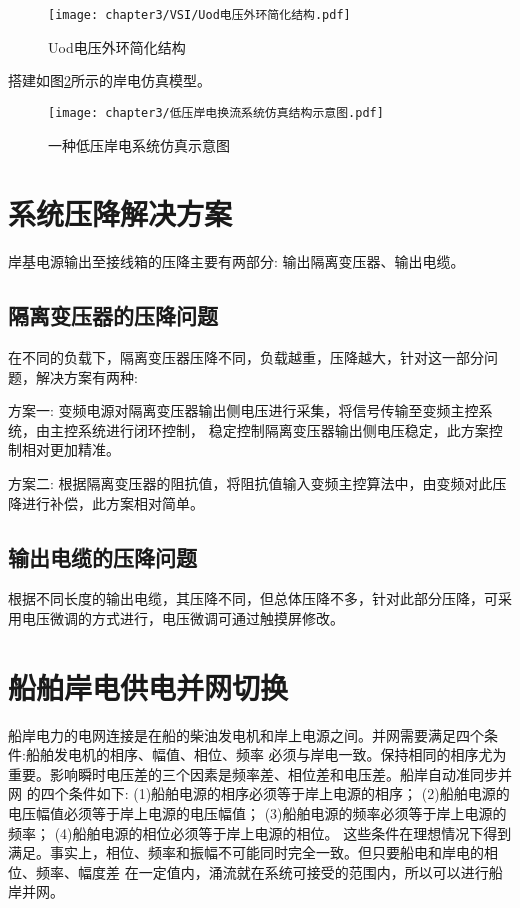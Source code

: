 \begin{figure}[!htp]
	\centering
	\texttt{[image: chapter3/VSI/Uod电压外环简化结构.pdf]}
	\caption{Uod电压外环简化结构}
	\label{fig:Uod电压外环简化结构}
\end{figure}

搭建如图\ref{fig:低压岸电系统仿真示意图}所示的岸电仿真模型。

\begin{figure}[!htp]
	\centering
	\texttt{[image: chapter3/低压岸电换流系统仿真结构示意图.pdf]}
	\caption{一种低压岸电系统仿真示意图}
	\label{fig:低压岸电系统仿真示意图}
\end{figure}

\section{系统压降解决方案}

岸基电源输出至接线箱的压降主要有两部分: 输出隔离变压器、输出电缆。

\subsection{隔离变压器的压降问题}

在不同的负载下，隔离变压器压降不同，负载越重，压降越大，针对这一部分问题，解决方案有两种:

方案一: 变频电源对隔离变压器输出侧电压进行采集，将信号传输至变频主控系统，由主控系统进行闭环控制，
稳定控制隔离变压器输出侧电压稳定，此方案控制相对更加精准。

方案二: 根据隔离变压器的阻抗值，将阻抗值输入变频主控算法中，由变频对此压降进行补偿，此方案相对简单。

\subsection{输出电缆的压降问题}

根据不同长度的输出电缆，其压降不同，但总体压降不多，针对此部分压降，可采用电压微调的方式进行，电压微调可通过触摸屏修改。


\section{船舶岸电供电并网切换}
船岸电力的电网连接是在船的柴油发电机和岸上电源之间。并网需要满足四个条件:船舶发电机的相序、幅值、相位、频率
必须与岸电一致。保持相同的相序尤为重要。影响瞬时电压差的三个因素是频率差、相位差和电压差。船岸自动准同步并网
的四个条件如下:
(1)船舶电源的相序必须等于岸上电源的相序；
(2)船舶电源的电压幅值必须等于岸上电源的电压幅值；
(3)船舶电源的频率必须等于岸上电源的频率；
(4)船舶电源的相位必须等于岸上电源的相位。
这些条件在理想情况下得到满足。事实上，相位、频率和振幅不可能同时完全一致。但只要船电和岸电的相位、频率、幅度差
在一定值内，涌流就在系统可接受的范围内，所以可以进行船岸并网。

